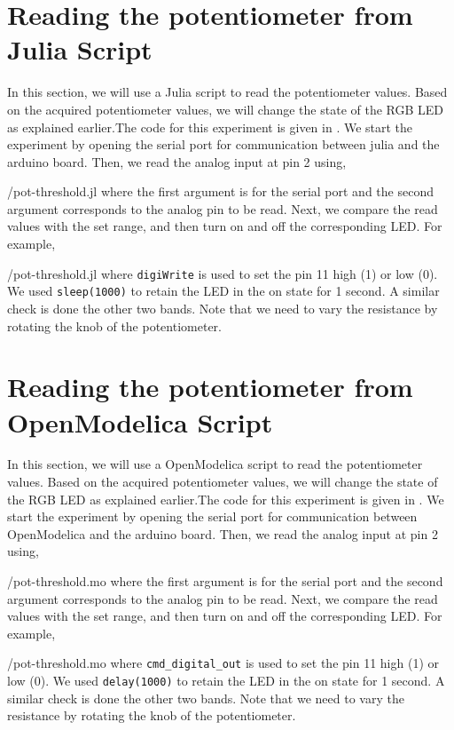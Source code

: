 \section{Reading the potentiometer from Julia Script}
In this section, we will use a Julia script to read the potentiometer values.  Based on the acquired potentiometer values, we will change the state of the RGB LED as explained earlier.The code for this experiment is given in
. We start the experiment by opening the serial port for communication between julia and the arduino board. Then, we read the analog input at pin 2 using,

{\LocPotjuliacode/pot-threshold.jl} where the first argument is for
the serial port and the second argument corresponds to the analog pin to be read.  Next, we compare the read values with the set range, and then turn on and off the corresponding LED. For example, 

{\LocPotjuliacode/pot-threshold.jl} where {\tt digiWrite} is used to set the pin 11 high (1) or low (0). We used {\tt sleep(1000)} to retain the LED in the on state for 1 second.  A similar check is done the other two bands. Note that we need to vary the resistance by rotating the knob of the potentiometer.



\section{Reading the potentiometer from OpenModelica Script}
In this section, we will use a OpenModelica script to read the potentiometer values.  Based on the acquired potentiometer values, we will change the state of the RGB LED as explained earlier.The code for this experiment is given in
. We start the experiment by opening the serial port for communication between OpenModelica and the arduino board. Then, we read the analog input at pin 2 using,

{\LocPotOpenModelicacode/pot-threshold.mo} where the first argument is for
the serial port and the second argument corresponds to the analog pin to be read.  Next, we compare the read values with the set range, and then turn on and off the corresponding LED. For example, 

{\LocPotOpenModelicacode/pot-threshold.mo} where {\tt cmd\_digital\_out} is used to set the pin 11 high (1) or low (0). We used {\tt delay(1000)} to retain the LED in the on state for 1 second.  A similar check is done the other two bands. Note that we need to vary the resistance by rotating the knob of the potentiometer.

